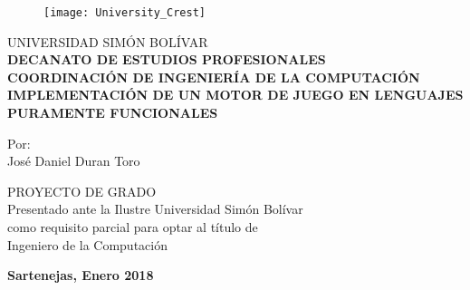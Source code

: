 \begin{caratula1}

\begin{figure}[!htbp!]
\centering
\texttt{[image: University\_Crest]}
\end{figure}

\begin{center}

\Large UNIVERSIDAD SIMÓN BOLÍVAR\\
\large \textbf {DECANATO DE ESTUDIOS PROFESIONALES}\\
\large \textbf {COORDINACIÓN DE INGENIERÍA DE LA COMPUTACIÓN}\\

\vfill
\large \textbf {IMPLEMENTACIÓN DE UN MOTOR DE JUEGO EN LENGUAJES PURAMENTE FUNCIONALES}

\vfill
Por:\\
José Daniel Duran Toro

\vfill
\large PROYECTO DE GRADO\\
Presentado ante la Ilustre Universidad Simón Bolívar\\
como requisito parcial para optar al título de\\
Ingeniero de la Computación

\vfill
\textbf {Sartenejas, Enero 2018}

\end{center}

\end{caratula1}
